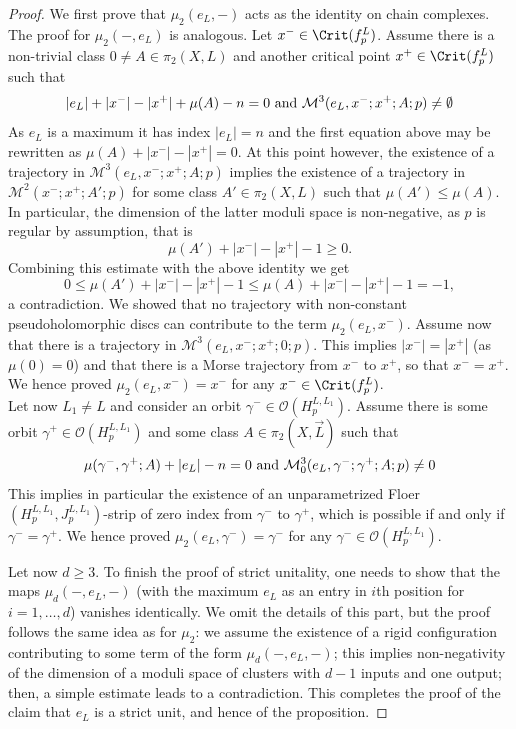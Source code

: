 \begin{proof}
		We first prove that $\mu_2(e_L,-)$ acts as the identity on chain complexes. The proof for $\mu_2(-,e_L)$ is analogous. Let $x^-\in \Crit(f^L_p)$. Assume there is a non-trivial class $0\neq A\in \pi_2(X,L)$ and another critical point $x^+\in \Crit(f^L_p)$ such that  $$|e_L|+|x^-|-|x^+|+\mu(A) -n = 0 \textnormal{   and   }\mathcal{M}^3(e_L,x^-;x^+;A;p)\neq \emptyset$$ As $e_L$ is a maximum it has index $|e_L|=n$ and the first equation above may be rewritten as $\mu(A)+|x^-|-|x^+|=0$. At this point however, the existence of a trajectory in $\mathcal{M}^3(e_L,x^-;x^+;A;p)$ implies the existence of a trajectory in $\mathcal{M}^2(x^-;x^+;A';p)$ for some class $A'\in \pi_2(X,L)$ such that $\mu(A')\leq \mu(A)$. In particular, the dimension of the latter moduli space is non-negative, as $p$ is regular by assumption, that is $$\mu(A')+|x^-|-|x^+|-1\geq 0.$$ Combining this estimate with the above identity we get $$0\leq \mu(A')+|x^-|-|x^+|-1\leq \mu(A)+|x^-|-|x^+|-1 = -1,$$ a contradiction. We showed that no trajectory with non-constant pseudoholomorphic discs can contribute to the term $\mu_2(e_L,x^-)$.
		Assume now that there is a trajectory in $\mathcal{M}^3(e_L,x^-;x^+;0;p)$. This implies $|x^-|=|x^+|$ (as $\mu(0)=0$) and that there is a Morse trajectory from $x^-$ to $x^+$, so that $x^-=x^+$. We hence proved $\mu_2(e_L,x^-)=x^-$ for any $x^-\in \Crit(f^L_p)$. \\ Let now $L_1\neq L$ and consider an orbit $\gamma^-\in \mathcal{O}(H^{L,L_1}_p)$. Assume there is some orbit $\gamma^+\in \mathcal{O}(H^{L,L_1}_p)$ and some class $A\in \pi_2(X,\vec{L})$ such that $$\mu(\gamma^-,\gamma^+;A)+|e_L|-n=0\textnormal{   and   } \mathcal{M}^3_0(e_L,\gamma^-;\gamma^+;A;p)\neq 0$$ This implies in particular the existence of an unparametrized Floer $(H^{L,L_1}_p, J^{L,L_1}_p)$-strip of zero index from $\gamma^-$ to $\gamma^+$, which is possible if and only if $\gamma^-=\gamma^+$. We hence proved $\mu_2(e_L,\gamma^-)=\gamma^-$ for any $\gamma^-\in \mathcal{O}(H^{L,L_1}_p)$.
		
		Let now $d\geq 3$. To finish the proof of strict unitality, one needs to show that the maps $\mu_d(-,e_L,-)$ (with the maximum $e_L$ as an entry in $i$th position for $i=1,\ldots, d$) vanishes identically. We omit the details of this part, but the proof follows the same idea as for $\mu_2$: we assume the existence of a rigid configuration contributing to some term of the form $\mu_d(-,e_L,-)$; this implies non-negativity of the dimension of a moduli space of clusters with $d-1$ inputs and one output; then, a simple estimate leads to a contradiction. This completes the proof of the claim that $e_L$ is a strict unit, and hence of the proposition.\end{proof}
